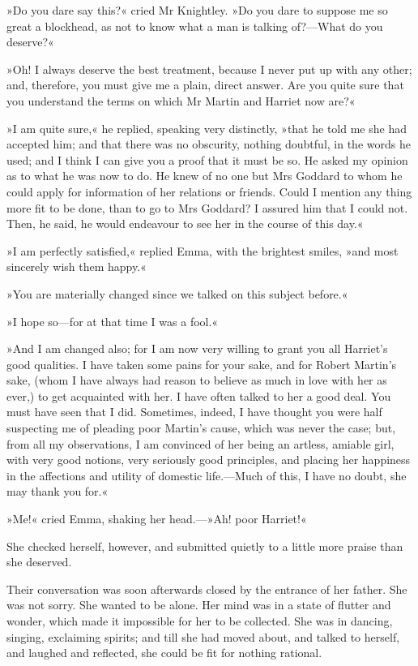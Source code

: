 »Do you dare say this?« cried Mr Knightley. »Do you dare to suppose me so great a blockhead, as not to know what a man is talking of?—What do you deserve?«

»Oh! I always deserve the best treatment, because I never put up with any other; and, therefore, you must give me a plain, direct answer. Are you quite sure that you understand the terms on which Mr Martin and Harriet now are?«

»I am quite sure,« he replied, speaking very distinctly, »that he told me she had accepted him; and that there was no obscurity, nothing doubtful, in the words he used; and I think I can give you a proof that it must be so. He asked my opinion as to what he was now to do. He knew of no one but Mrs Goddard to whom he could apply for information of her relations or friends. Could I mention any thing more fit to be done, than to go to Mrs Goddard? I assured him that I could not. Then, he said, he would endeavour to see her in the course of this day.«

»I am perfectly satisfied,« replied Emma, with the brightest smiles, »and most sincerely wish them happy.«

»You are materially changed since we talked on this subject before.«

»I hope so—for at that time I was a fool.«

»And I am changed also; for I am now very willing to grant you all Harriet's good qualities. I have taken some pains for your sake, and for Robert Martin's sake, (whom I have always had reason to believe as much in love with her as ever,) to get acquainted with her. I have often talked to her a good deal. You must have seen that I did. Sometimes, indeed, I have thought you were half suspecting me of pleading poor Martin's cause, which was never the case; but, from all my observations, I am convinced of her being an artless, amiable girl, with very good notions, very seriously good principles, and placing her happiness in the affections and utility of domestic life.—Much of this, I have no doubt, she may thank you for.«

»Me!« cried Emma, shaking her head.—»Ah! poor Harriet!«

She checked herself, however, and submitted quietly to a little more praise than she deserved.

Their conversation was soon afterwards closed by the entrance of her father. She was not sorry. She wanted to be alone. Her mind was in a state of flutter and wonder, which made it impossible for her to be collected. She was in dancing, singing, exclaiming spirits; and till she had moved about, and talked to herself, and laughed and reflected, she could be fit for nothing rational.

